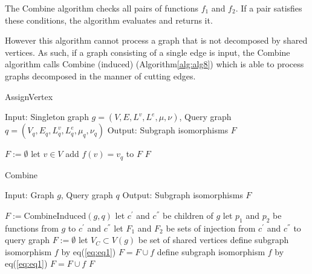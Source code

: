 The Combine algorithm checks all pairs of functions $f_1$ and $f_2$. If a pair satisfies these conditions, the algorithm evaluates and returns it.

However this algorithm cannot process a graph that is not decomposed by shared vertices. As such, if a graph consisting of a single edge
is input, the Combine algorithm calls Combine (induced) (Algorithm\ref{alg:alg8}) which is able to process graphs decomposed in the 
manner of cutting edges.

\begin{algorithm}
\caption{AssignVertex}
\label{alg:alg6}
\begin{algorithmic}
\STATE Input: Singleton graph $g=(V,E,L^v ,L^e ,\mu,\nu)$, Query graph $q=(V_q,E_q,L_q^v ,L_q^e ,\mu_q,\nu_q)$ 
\STATE Output: Subgraph isomorphisms $F$
\end{algorithmic}
\begin{algorithmic}[1]
\STATE $F := \emptyset$
\STATE let $v \in V$
		\STATE add $f(v) = v_q$ to $F$
	\ENDIF
\ENDFOR
\RETURN $F$
\end{algorithmic}
\end{algorithm}

\begin{algorithm}
\caption{Combine}
\label{alg:alg11}
\begin{algorithmic}
\STATE Input: Graph $g$, Query graph $q$
\STATE Output: Subgraph isomorphisms $F$
\end{algorithmic}
\begin{algorithmic}[1]
	\STATE $F := $CombineInduced$(g,q)$
\ELSE
	\STATE let $c^{'}$ and $c^{''}$ be children of $g$
	\STATE let $p_1$ and $p_2$ be functions from $g$ to $c^{'}$ and $c^{''}$
	\STATE let $F_1$ and $F_2$ be sets of injection from $c^{'}$ and $c^{''}$ to query graph
	\STATE $F := \emptyset$
		\STATE let $V_C \subset V(g)$ be set of shared vertices
					\STATE define subgraph isomorphism $f$ by eq(\ref{eq:eq1})
					\STATE $F = F \cup f $
				\ENDIF
			\ENDIF
		\ENDFOR
	\ELSE
				\STATE define subgraph isomorphism $f$ by eq(\ref{eq:eq1})
				\STATE $F = F \cup f $
			\ENDIF
		\ENDFOR
	\ENDIF
\ENDIF
\RETURN $F$
\end{algorithmic}
\end{algorithm}

